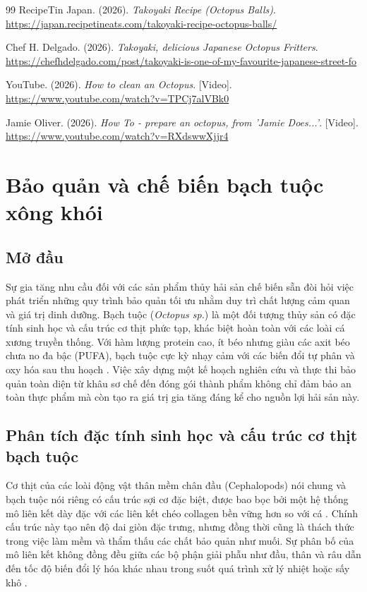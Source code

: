 \documentclass[12pt,a4paper]{report}
\begin{document}
\begin{thebibliography}{99}
 RecipeTin Japan. (2026). \textit{Takoyaki Recipe (Octopus Balls)}. \url{https://japan.recipetineats.com/takoyaki-recipe-octopus-balls/}

 Chef H. Delgado. (2026). \textit{Takoyaki, delicious Japanese Octopus Fritters}. \url{https://chefhdelgado.com/post/takoyaki-is-one-of-my-favourite-japanese-street-fo}

 YouTube. (2026). \textit{How to clean an Octopus}. [Video]. \url{https://www.youtube.com/watch?v=TPCj7alVBk0}

 Jamie Oliver. (2026). \textit{How To - prepare an octopus, from 'Jamie Does...'}. [Video]. \url{https://www.youtube.com/watch?v=RXdswwXjjr4}

\end{thebibliography}



\chapter{Bảo quản và chế biến bạch tuộc xông khói}
\section{Mở đầu}

Sự gia tăng nhu cầu đối với các sản phẩm thủy hải sản chế biến sẵn đòi hỏi việc phát triển những quy trình bảo quản tối ưu nhằm duy trì chất lượng cảm quan và giá trị dinh dưỡng. Bạch tuộc (\textit{Octopus sp.}) là một đối tượng thủy sản có đặc tính sinh học và cấu trúc cơ thịt phức tạp, khác biệt hoàn toàn với các loài cá xương truyền thống. Với hàm lượng protein cao, ít béo nhưng giàu các axit béo chưa no đa bậc (PUFA), bạch tuộc cực kỳ nhạy cảm với các biến đổi tự phân và oxy hóa sau thu hoạch \cite{lipid_storage}. Việc xây dựng một kế hoạch nghiên cứu và thực thi bảo quản toàn diện từ khâu sơ chế đến đóng gói thành phẩm không chỉ đảm bảo an toàn thực phẩm mà còn tạo ra giá trị gia tăng đáng kể cho nguồn lợi hải sản này.

\section{Phân tích đặc tính sinh học và cấu trúc cơ thịt bạch tuộc}

Cơ thịt của các loài động vật thân mềm chân đầu (Cephalopods) nói chung và bạch tuộc nói riêng có cấu trúc sợi cơ đặc biệt, được bao bọc bởi một hệ thống mô liên kết dày đặc với các liên kết chéo collagen bền vững hơn so với cá \cite{octopus_texture}. Chính cấu trúc này tạo nên độ dai giòn đặc trưng, nhưng đồng thời cũng là thách thức trong việc làm mềm và thẩm thấu các chất bảo quản như muối. Sự phân bố của mô liên kết không đồng đều giữa các bộ phận giải phẫu như đầu, thân và râu dẫn đến tốc độ biến đổi lý hóa khác nhau trong suốt quá trình xử lý nhiệt hoặc sấy khô \cite{octopus_drying}.
\end{document}
